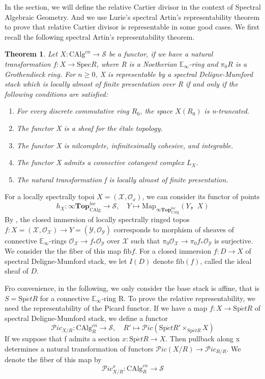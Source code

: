 \documentclass[12pt]{article}
\newtheorem{theorem}{Theorem}[section] %
\theoremstyle{thry}
\def  \CAlg     {\mathrm{CAlg}}
\def  \fib      {\mathrm{fib}}
\def  \ringtop  {\infty\Top^{\mathrm{loc}}_{\CAlg}}
\def  \Map      {\mathrm{Map}}
\def  \Spec     {\mathrm{Spec}}
\def  \Spet     {\mathrm{Sp}\acute{e}t}
\def  \Top      {\mathbf{Top}}
\def  \co       {\mathcal{O}}
\def  \cs       {\mathcal{S}}
\def  \cx       {\mathcal{X}}
\def  \cy       {\mathcal{Y}}
\def  \be       {\mathbb{E}}
\def  \sp       {\mathscr{P}}
\begin{document}
\quad In the section, we will define the relative Cartier divisor in the context of Spectral Algebraic Geometry. And we use Lurie's spectral Artin's representability theorem to prove that relative Cartier divisor is representable in some good cases. We first recall the following spectral Artin's representability theorem.
\begin{theorem} \cite[Theroem 18.3.0.1]{lu-SAG}
	Let $X: \CAlg^{cn} \to \cs$ be a functor, if we have a natural transformation $f: X \to \Spec R$, where R is a Noetherian $\be_{\infty}$-ring and $\pi_0 R$ is a Grothendieck ring. For $n \geq 0$, X is representable by a spectral Deligne-Mumford stack which is locally almost of finite presentation over R if and only if the following conditions are satisfied:
	\begin{enumerate}
		\item For every discrete commutative ring $R_0$, the space $X(R_0)$ is n-truncated.
		\item The functor X is a sheaf for the \'etale topology.
		\item The functor X is nilcomplete, infinitesimally cohesive, and integrable.
		\item The functor X admits a connective cotangent complex $L_X$.
		\item The natural transformation f is locally almost of finite presentation.
	\end{enumerate}	
\end{theorem}

For a locally spectrally topoi $X=(\cx, \co_x)$,  we can consider its functor of points
$$
h_X:  \infty \Top^{loc}_{\CAlg} \to \cs, \quad   Y \mapsto \Map_{\ringtop}(Y，X)
$$
By \cite[Remark 3.1.1.2]{lu-SAG}, the closed immersion of locally spectrally ringed topos $f: X=(\cx, \co_{\cx}) \to Y=(\cy, \co_{\cy})$  corresponds to morphism of sheaves of connective $\be_{\infty}$-rings $\co_{\cx} \to f_* \co_{\cy} $ over $\cx$ such that $\pi_0\co_{\cx} \to  \pi_0f_* \co_{\cy} $ is surjective. We consider the the fiber  of this map $\fib f$. For a closed immersion $f: D \to X$ of spectral Deligne-Mumford stack, we let $I(D)$ denote $\fib(f)$, called the ideal sheaf of $D$.




Fro convenience, in the following, we only consider the base stack is affine, that is $S = \Spet R$ for a connective $\be_{\infty}$-ring R. To prove the relative representability, we need the representability of the Picard functor. If we have  a map $f: X \to \Spet R$ of spectral Deligne-Mumford stack, 
we define a functor 
$$
\sp ic_{X/R}: \CAlg^{cn}_R \to \cs, \quad    R' \mapsto  \sp ic(\Spet R' \times_{\Spet R } X)
$$
If we suppose that  f admits a section $x: \Spet R \to X$. Then pullback along x determines a natural transformation of functors $\sp ic(X/R) \to \sp ic _{R/R}$. We denote the fiber of this map by 
$$
\sp ic^x_{X/R}: \CAlg^{cn}_R \to \cs
$$
\end{document}
